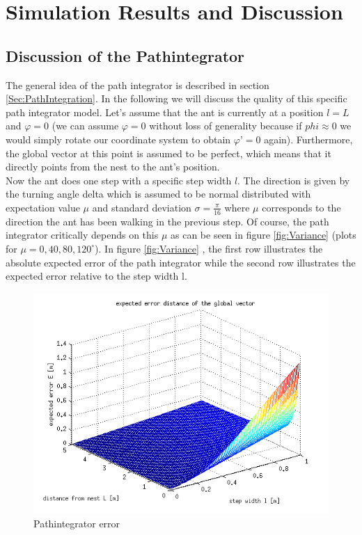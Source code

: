 \documentclass[11pt]{article}
\begin{document}



%

\section{Simulation Results and Discussion}
\subsection{Discussion of the Pathintegrator}
The general idea of the path integrator is described in section \ref{Sec:PathIntegration}. In the following we will discuss the quality of this specific path integrator model.
Let’s assume that the ant is currently at a position $l = L$ and $\varphi = 0$ (we can assume $\varphi = 0$ without loss of generality because if $phi \approx 0$ we would simply rotate our coordinate system to obtain $\varphi’ = 0$ again). Furthermore, the global vector at this point is assumed to be perfect, which means that it directly points from the nest to the ant’s position. \\
Now the ant does one step with a specific step width $l$. The direction is given by the turning angle delta which is assumed to be normal distributed with expectation value $\mu$ and standard deviation $\sigma = \frac{\pi}{16}$ where $\mu$ corresponds to the direction the ant has been walking in the previous step. Of course, the path integrator critically depends on this $\mu$ as can be seen in figure \ref{fig:Variance} (plots for $\mu=0,40,80,120^{\circ}$). In figure \ref{fig:Variance} , the first row illustrates the absolute expected error of the path integrator while the second row illustrates the expected error relative to the step width l.

\begin{figure}[H]
\centering
\includegraphics[scale=0.31]{./Pics/Pathintegrator_error_plot.png} 
\caption{Pathintegrator error \label{fig:PathintegratorError} }
\end{figure} 
\end{document}
